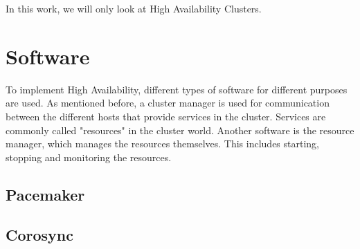 In this work, we will only look at High Availability Clusters.

\section{Software}
To implement High Availability, different types of software for different purposes are used.
As mentioned before, a cluster manager is used for communication between the different hosts that
provide services in the cluster. Services are commonly called "resources" in the cluster world.
Another software is the resource manager, which manages the resources themselves.
This includes starting, stopping and monitoring the resources.
\subsection{Pacemaker}
\subsection{Corosync}
